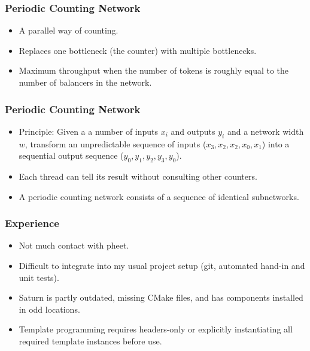\documentclass[notes=show]{beamer}
\begin{document}
\begin{frame}
\frametitle{Periodic Counting Network}
\begin{itemize}
\item A parallel way of counting.
\item Replaces one bottleneck (the counter) with multiple bottlenecks.
\item Maximum throughput when the number of tokens is roughly equal to the number of 
 	  balancers in the network.
\end{itemize}
\end{frame}

\begin{frame}
\frametitle{Periodic Counting Network}
\begin{itemize}
\item Principle: Given a a number of inputs $x_i$ and outputs $y_i$ and a network width $w$,
      transform an unpredictable sequence of inputs ($x_3, x_2, x_2, x_0, x_1$) into a sequential
      output sequence ($y_0, y_1, y_2, y_3, y_0$).
\item Each thread can tell its result without consulting other counters.
\item A periodic counting network consists of a sequence of identical subnetworks.
\end{itemize}
\end{frame}

\begin{frame}
\frametitle{Experience}
\begin{itemize}
\item Not much contact with pheet.
\item Difficult to integrate into my usual project setup (git, automated
      hand-in and unit tests).
\item Saturn is partly outdated,
      missing CMake files, and has components installed in odd locations.
\item Template programming requires headers-only or explicitly instantiating all
      required template instances before use.
\end{itemize}
\end{frame}
\end{document}
